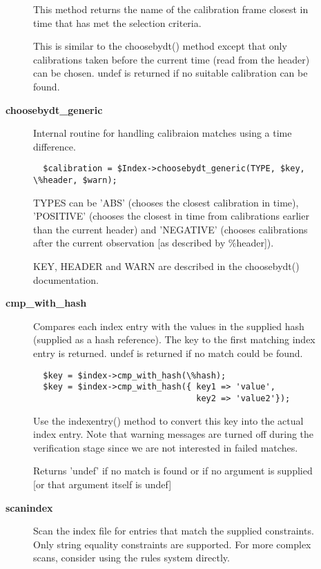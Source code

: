 \begin{description}
\begin{description}
This method returns the name of the calibration frame closest in
time that has met the selection criteria.



This is similar to the choosebydt() method except that only
calibrations taken before the current time (read from the
header) can be chosen. undef is returned if no suitable
calibration can be found.


\item[{\textbf{choosebydt\_generic}}] \mbox{}

Internal routine for handling calibraion matches using a
time difference.

\begin{verbatim}
  $calibration = $Index->choosebydt_generic(TYPE, $key, \%header, $warn);
\end{verbatim}


TYPES can be 'ABS' (chooses the closest calibration in time),
'POSITIVE' (chooses the closest in time from calibrations earlier
than the current header) and 'NEGATIVE' (chooses calibrations after
the current observation [as described by \%header]).



KEY, HEADER and WARN are described in the choosebydt() documentation.


\item[{\textbf{cmp\_with\_hash}}] \mbox{}

Compares each index entry with the values in the supplied hash
(supplied as a hash reference). The key to the first matching
index entry is returned. undef is returned if no match could be
found.

\begin{verbatim}
  $key = $index->cmp_with_hash(\%hash);
  $key = $index->cmp_with_hash({ key1 => 'value',
                                 key2 => 'value2'});
\end{verbatim}


Use the indexentry() method to convert this key into the actual
index entry. Note that warning messages are turned off during the
verification stage since we are not interested in failed matches.



Returns 'undef' if no match is found or if no argument is supplied
[or that argument itself is undef]


\item[{\textbf{scanindex}}] \mbox{}

Scan the index file for entries that match the supplied constraints.
Only string equality constraints are supported. For more complex scans,
consider using the rules system directly.


\end{description}
\end{description}
